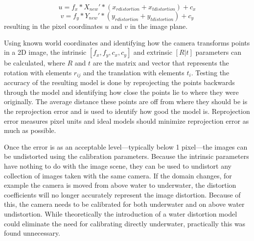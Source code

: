 \begin{equation}
u=f_{x}*X_{new}'*(x_{r\textit{distortion}}+x_{t\textit{distortion}})+c_{x}
\end{equation}
\begin{equation}
v=f_{y}*Y_{new}'*(y_{r\textit{distortion}}+y_{t\textit{distortion}})+c_{y}
\end{equation}
resulting in the pixel coordinates $u$ and $v$ in the image plane.


Using known world coordinates and identifying how the camera transforms points in a 2D image, the intrinsic $[f_x,f_y,c_x,c_y]$ and extrinsic $[R|t]$ parameters can be calculated, where $R$ and $t$ are the matrix and vector that represents the rotation with elements $r_{ij}$ and the translation with elements $t_i$. Testing the accuracy of the resulting model is done by reprojecting the points backwards through the model and identifying how close the points lie to where they were originally. The average distance these points are off from where they should be is the reprojection error and is used to identify how good the model is. Reprojection error measures pixel units and ideal models should minimize reprojection error as much as possible.

Once the error is as an acceptable level---typically below 1 pixel---the images can be undistorted using the calibration parameters. Because the intrinsic parameters have nothing to do with the image scene, they can be used to undistort any collection of images taken with the same camera. If the domain changes, for example the camera is moved from above water to underwater, the distortion coefficients will no longer accurately represent the image distortion. Because of this, the camera needs to be calibrated for both underwater and on above water  undistortion. While theoretically the introduction of a water distortion model could eliminate the need for calibrating directly underwater, practically this was found unnecessary. 

